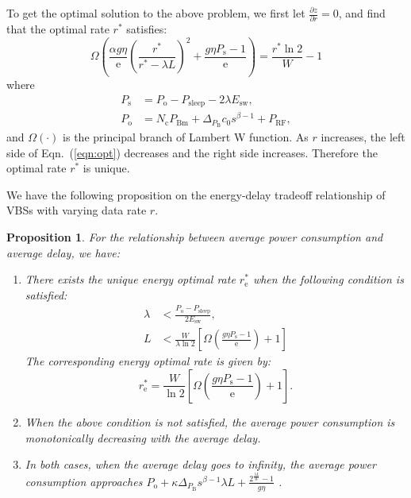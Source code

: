 \documentclass[conference]{IEEEtran}
\newcommand{\e}{\mathrm{e}}
\newtheorem{proposition}{Proposition}
\begin{document}
To get the optimal solution to the above problem, we first let
$ \frac{\partial z}{\partial r} = 0 $, and find that
the optimal rate $r^*$ satisfies:
\begin{equation}
  \Omega\left( \frac{\alpha g \eta}{\e} \left(\frac{r^*}{r^*
  - \lambda L}\right)^2 + \frac{g \eta P_\text{s} - 1}{\e}
  \right) = \frac{r^* \ln 2}{W} - 1
  \label{eqn:opt}
\end{equation}
where
\begin{align}
  P_\text{s} &= P_\text{o}-P_\text{sleep}- 2\lambda E_\text{sw}, \\
  P_\text{o} &= N_\text{c} P_\text{Bm} + \Delta_{P_\text{B}} c_0 s^{\beta - 1} + P_{\text{RF}} ,
  \label{eqn:Ps}
\end{align}
and $\Omega(\cdot)$ is the principal branch of Lambert W function.
As $r$ increases,
the left side of Eqn.~(\ref{eqn:opt}) decreases and the right side increases.
Therefore the optimal rate $r^*$ is unique.

We have the following proposition on the energy-delay tradeoff relationship
of VBSs with varying data rate $r$.
\begin{proposition}
  For the relationship between average power consumption and average
  delay, we have:
  \begin{enumerate}
    \item There exists the unique energy optimal rate $r_\text{e}^*$ when the
  following condition is satisfied:
  \begin{align}
    \lambda & < \frac{P_\text{o} - P_\text{sleep}}{2 E_\text{sw}}, \\
    L & < \frac{W}{\lambda \ln 2} \left[ \Omega\left(\frac{g \eta
    P_\text{s}- 1}{\e}
    \right)+ 1 \right]
    \label{eqn:condition}
  \end{align}
  \label{eqn:proposition1}
  The corresponding energy optimal rate is given by:
\begin{equation}
  r_\text{e}^* = \frac{W}{\ln 2} \left[ \Omega\left(\frac{g \eta P_\text{s} - 1}{\e}
  \right)+ 1 \right] .
  \label{eqn:e-opt}
\end{equation}
\item  When the above condition is not satisfied,
  the average power consumption is
  monotonically decreasing with the average delay.
\item In both cases, when the average delay goes to infinity, the average
  power consumption approaches $P_\text{o} + \kappa \Delta_{P_\text{B}} s^{\beta
  - 1} \lambda L + \frac{2^{\frac{\lambda L}{W}} - 1}{g \eta}$ .
  \end{enumerate}
\end{proposition}
\end{document}
